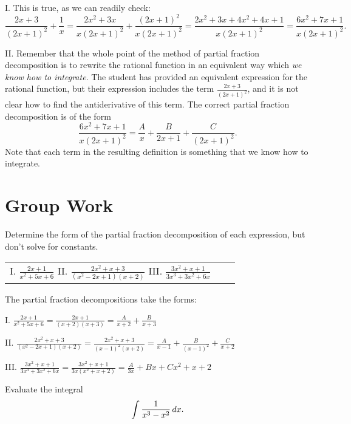 \documentclass[handout]{ximera}
\begin{document}
\begin{freeResponse}
I. This is true, as we can readily check:
$$
\frac{2x+3}{(2x+1)^2}+\frac{1}{x} = \frac{2x^2+3x}{x(2x+1)^2} + \frac{(2x+1)^2}{x(2x+1)^2} = \frac{2x^2+3x+4x^2+4x+1}{x(2x+1)^2} =\frac{6x^2+7x+1}{x(2x+1)^2}.
$$

II. Remember that the whole point of the method of partial fraction decomposition is to rewrite the rational function in an equivalent way which \emph{we know how to integrate}. The student has provided an equivalent expression for the rational function, but their expression includes the term  $\frac{2x+3}{(2x+1)^2}$, and it is not clear how to find the antiderivative of this term. The correct partial fraction decomposition is of the form
$$
\frac{6x^2+7x+1}{x(2x+1)^2} = \frac{A}{x} + \frac{B}{2x+1} + \frac{C}{(2x+1)^2}.
$$
Note that each term in the resulting definition is something that we know how to integrate. 
\end{freeResponse}

\section{Group Work}

\begin{problem}
Determine the form of the partial fraction decomposition of each expression, but don't solve for constants.
\begin{center}
\begin{tabular}{lll}
I. $\frac{2x+1}{x^2+5x+6}$ \hspace{.2in} II. $\frac{2x^2+x+3}{(x^2-2x+1)(x+2)}$ \hspace{.2in} III. $\frac{3x^2+x+1}{3x^3+3x^2+6x}$
\end{tabular}
\end{center}
\end{problem}

\begin{freeResponse}
The partial fraction decompositions take the forms:

I. $\frac{2x+1}{x^2+5x+6} = \frac{2x+1}{(x+2)(x+3)} = \frac{A}{x+2} + \frac{B}{x+3}$

II. $\frac{2x^2+x+3}{(x^2-2x+1)(x+2)} = \frac{2x^2+x+3}{(x-1)^2(x+2)} = \frac{A}{x-1} + \frac{B}{(x-1)^2} + \frac{C}{x+2}$

III. $\frac{3x^2+x+1}{3x^3+3x^2+6x} = \frac{3x^2 + x + 1}{3x(x^2+x + 2)} = \frac{A}{3x} + {Bx+C}{x^2+x+2}$
\end{freeResponse}

\begin{problem}
Evaluate the integral
$$
\int \frac{1}{x^3-x^2} \mathop{}\!d x.
$$
\end{problem}
\end{document}
